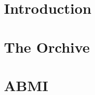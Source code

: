 \label{chapter:case_studies}


\section{Introduction}\label{sec:introduction}


\section{The Orchive}\label{sec:the_orchive}






\section{ABMI}\label{sec:abmi}
